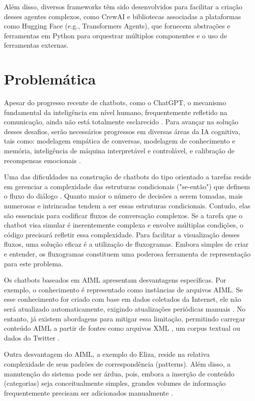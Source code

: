 \documentclass[14pt,a4paper,oneside]{book}
\begin{document}
Além disso, diversos frameworks têm sido desenvolvidos para facilitar a criação desses agentes complexos, como CrewAI e bibliotecas associadas a plataformas como Hugging Face (e.g., Transformers Agents), que fornecem abstrações e ferramentas em Python para orquestrar múltiplos componentes e o uso de ferramentas externas.

\section{Problemática}	

Apesar do progresso recente de chatbots, como o ChatGPT, o mecanismo fundamental da inteligência em nível humano, frequentemente refletido na comunicação, ainda não está totalmente esclarecido \cite{Shum2018}. 
Para avançar na solução desses desafios, serão necessários progressos em diversas áreas da IA cognitiva, tais como: modelagem empática de conversas, modelagem de conhecimento e memória, inteligência de máquina interpretável e controlável, e calibração de recompensas emocionais \cite{Shum2018}.

Uma das dificuldades na construção de chatbots do tipo orientado a tarefas reside em gerenciar a complexidade das estruturas condicionais ("se-então") que definem o fluxo do diálogo \cite{Raj2019}. Quanto maior o número de decisões a serem tomadas, mais numerosas e intrincadas tendem a ser essas estruturas condicionais. Contudo, elas são essenciais para codificar fluxos de conversação complexos. 
Se a tarefa que o chatbot visa simular é inerentemente complexa e envolve múltiplas condições, o código precisará refletir essa complexidade. 
Para facilitar a visualização desses fluxos, uma solução eficaz é a utilização de fluxogramas.  %
Embora simples de criar e entender, os fluxogramas constituem uma poderosa ferramenta de representação para este problema.

Os chatbots baseados em AIML apresentam desvantagens específicas. Por exemplo, o conhecimento é representado como instâncias de arquivos AIML. 
Se esse conhecimento for criado com base em dados coletados da Internet, ele não será atualizado automaticamente, exigindo atualizações periódicas manuais \cite{Madhumitha2015}. 
No entanto, já existem abordagens para mitigar essa limitação, permitindo carregar conteúdo AIML a partir de fontes como arquivos XML \cite{Macedo2014}, um corpus textual \cite{DeGasperis2013} ou dados do Twitter \cite{Yamaguchi2018}.

Outra desvantagem do AIML, a exemplo do Eliza, reside na relativa complexidade de seus padrões de correspondência (patterns). Além disso, a manutenção do sistema pode ser árdua, pois, embora a inserção de conteúdo (categorias) seja conceitualmente simples, grandes volumes de informação frequentemente precisam ser adicionados manualmente \cite{Madhumitha2015}.
\end{document}
